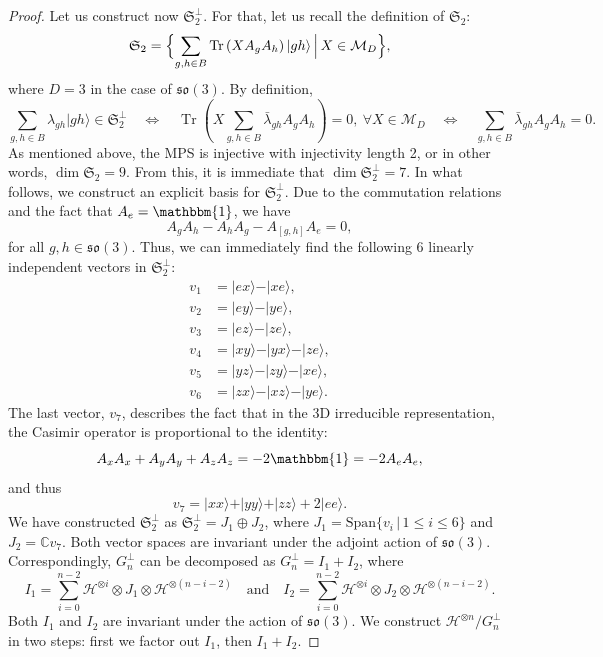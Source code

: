\documentclass[a4paper]{article}
\newcommand{\ket}[1]{\vert #1 \rangle}
\newcommand{\tr}{\operatorname{Tr}}
\newcommand{\id}{\mathbbm{1}}
\newcommand{\Span}{\mathrm{Span}}
\newcommand{\so}{\mathfrak{so}}
\theoremstyle{definition}
\begin{document}
\begin{proof}
Let us construct now $\mathfrak{S}_2^\perp$. For that, let us recall the definition of $\mathfrak{S}_2$:
\begin{equation}\label{eq:MPS_obc_space_2}
    \mathfrak{S}_2 = \Bigl\{\sum_{g,h\in B} \tr\left( X A_g A_h \right) \ket{gh} \,\Big|\, X\in \mathcal{M}_D\Bigr\},
\end{equation}
where $D=3$ in the case of $\so(3)$.
By definition,
\begin{equation}\label{eq:quadr_rel}
    \sum_{g,h\in B} \lambda_{gh} \ket{gh} \in \mathfrak{S}_2^\perp 
    \quad \Leftrightarrow \quad 
    \tr\left( X \sum_{g,h\in B} \bar{\lambda}_{gh} A_g A_h \right) =0, \ \forall X\in\mathcal{M}_D \quad \Leftrightarrow \quad
    \sum_{g,h\in B} \bar{\lambda}_{gh} A_g A_h = 0.
\end{equation}
As mentioned above, the MPS is injective with injectivity length 2, or in other words, $\dim \mathfrak{S}_2 = 9$. From this, it is immediate that $\dim \mathfrak{S}_2^\perp = 7$. In what follows, we construct an explicit basis for $\mathfrak{S}_2^\perp$. 
Due to the commutation relations and the fact that $A_e = \id$, we have
\begin{equation}\label{eq:comm_rel}
    A_g A_h - A_h A_g - A_{[g,h]} A_e =0,
\end{equation}
for all $g,h\in\so(3)$. Thus, we can immediately find the following 6 linearly independent vectors in $\mathfrak{S}_2^\perp$:
\begin{align*}
    v_1 & =\ket{ex} - \ket{xe}, \\
    v_2 & = \ket{ey} - \ket{ye}, \\
    v_3 &= \ket{ez} - \ket{ze}, \\
    v_4 &= \ket{xy} - \ket{yx} - \ket{ze}, \\
    v_5 &= \ket{yz} - \ket{zy} - \ket{xe}, \\
    v_6 &= \ket{zx} - \ket{xz} - \ket{ye}.
\end{align*}
The last vector, $v_7$, describes the fact that in the 3D irreducible representation, the Casimir operator is proportional to the identity:
\begin{equation*}
    A_xA_x + A_yA_y + A_zA_z = -2 \id = -2 A_e A_e,
\end{equation*}
and thus
\begin{equation*}
    v_7 = \ket{xx} + \ket{yy} + \ket{zz} + 2 \ket{ee}.
\end{equation*}
We have constructed $\mathfrak{S}_2^\perp$ as $\mathfrak{S}_2^\perp = J_1 \oplus J_2$, where $J_1 = \Span\{v_i\,|\,1\le i\le6\}$ and $J_2 = \mathbb{C} v_7$. Both vector spaces are invariant under the adjoint action of $\so(3)$. Correspondingly, $G_n^\perp$ can be decomposed as $ G_n^\perp = I_1 + I_2$, where
\begin{equation}\label{eq:i1i2}
  I_1 = \sum_{i=0}^{n-2} \mathcal{H}^{\otimes i} \otimes J_1 \otimes \mathcal{H}^{\otimes (n-i-2)} \quad \text{and} \quad 
  I_2 = \sum_{i=0}^{n-2} \mathcal{H}^{\otimes i} \otimes J_2 \otimes \mathcal{H}^{\otimes (n-i-2)}.
\end{equation}
Both $I_1$ and $I_2$ are invariant under the action of $\so(3)$. We construct $\mathcal{H}^{\otimes n}/G_n^\perp$ in two steps: first we factor out $I_1$, then $I_1 + I_2$. 


\end{proof}
\end{document}
